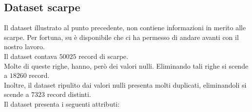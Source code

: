 \documentclass[a4paper, 11pt, oneside]{report}
\begin{document}
                \subsection{Dataset scarpe}
                Il dataset illustrato al punto precedente, non contiene informazioni in merito alle scarpe.
                Per fortuna, su \cite{3} è disponibile  \cite{7} che ci ha permesso di andare avanti con il nostro lavoro.
                \\
                Il dataset contava $50025$ record di scarpe.
                \\
                Molte di queste righe, hanno, però dei valori nulli.
                Eliminando tali righe si scende a $18260$ record.\\
                Inoltre, il dataset ripulito dai valori nulli presenta molti duplicati, eliminandoli si scende a $7323$ record distinti.\\
                Il dataset presenta i seguenti attributi:
\end{document}
